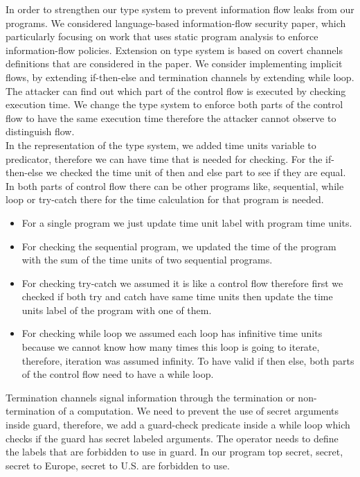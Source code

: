\documentclass[../DraftNotes.tex]{subfiles}
\begin{document}
In order to strengthen our type system to prevent information flow leaks from our programs. We considered language-based information-flow security paper, which particularly focusing on work that uses static program analysis to enforce information-flow policies. Extension on type system is based on covert channels definitions that are considered in the paper. We consider implementing implicit flows, by extending if-then-else and termination channels by extending while loop.
\newline
\\
The attacker can find out which part of the control flow is executed by checking execution time. We change the type system to enforce both parts of the control flow to have the same execution time therefore the attacker cannot observe to distinguish flow.
\newline
\\
In the representation of the type system, we added time units variable to predicator, therefore we can have time that is needed for checking. For the if-then-else we checked the time unit of then and else part to see if they are equal. In both parts of control flow there can be other programs like, sequential, while loop or try-catch there for the time calculation for that program is needed.

\begin{itemize}
	\item For a single program we just update time unit label with program time units.
	\item For checking the sequential program, we updated the time of the program with the sum of the time units of two sequential programs.
	\item For checking try-catch we assumed it is like a control flow therefore first we checked if both try and catch have same time units then update the time units label of the program with one of them.  
	\item For checking while loop we assumed each loop has infinitive time units because we cannot know how many times this loop is going to iterate, therefore, iteration was assumed infinity. To have valid if then else, both parts of the control flow need to have a while loop.
\end{itemize}

\noindent
Termination channels signal information through the termination or non-termination of a computation. We need to prevent the use of secret arguments inside guard, therefore, we add a guard-check predicate inside a while loop which checks if the guard has secret labeled arguments. The operator needs to define the labels that are forbidden to use in guard. In our program top secret, secret, secret to Europe, secret to U.S. are forbidden to use. 
\end{document}
